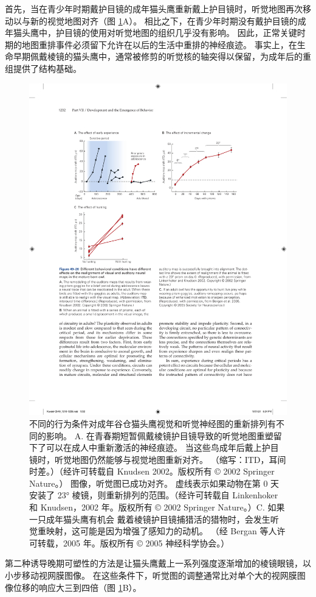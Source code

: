 首先，当在青少年时期戴护目镜的成年猫头鹰重新戴上护目镜时，听觉地图再次移动以与新的视觉地图对齐（图 \ref{fig:49_20}A）。
相比之下，在青少年时期没有戴护目镜的成年猫头鹰中，护目镜的使用对听觉地图的组织几乎没有影响。
因此，正常关键时期的地图重排事件必须留下允许在以后的生活中重排的神经痕迹。
事实上，在生命早期佩戴棱镜的猫头鹰中，通常被修剪的听觉核的轴突得以保留，为成年后的重组提供了结构基础。


\begin{figure}[htbp]
	\centering
	\includegraphics[width=0.8\linewidth]{chap49/fig_49_20}
	\caption{不同的行为条件对成年谷仓猫头鹰视觉和听觉神经图的重新排列有不同的影响。 A. 在青春期短暂佩戴棱镜护目镜导致的听觉地图重塑留下了可以在成人中重新激活的神经痕迹。 当这些鸟成年后戴上护目镜时，听觉地图仍然能够与视觉地图重新对齐。 （缩写：ITD，耳间时差。）（经许可转载自 Knudsen 2002。版权所有 © 2002 Springer Nature。） 图像，听觉图已成功对齐。 虚线表示如果动物在第 0 天安装了 23° 棱镜，则重新排列的范围。（经许可转载自 Linkenhoker 和 Knudsen，2002 年。版权所有 © 2002 Springer Nature。）C. 如果一只成年猫头鹰有机会 戴着棱镜护目镜捕猎活的猎物时，会发生听觉重映射，这可能是因为增强了感知力的动机。 （经 Bergan 等人许可转载，2005 年。版权所有 © 2005 神经科学协会。）}
	\label{fig:49_20}
\end{figure}


第二种诱导晚期可塑性的方法是让猫头鹰戴上一系列强度逐渐增加的棱镜眼镜，以小步移动视网膜图像。
在这些条件下，听觉图的调整通常比对单个大的视网膜图像位移的响应大三到四倍（图 \ref{fig:49_20}B）。


